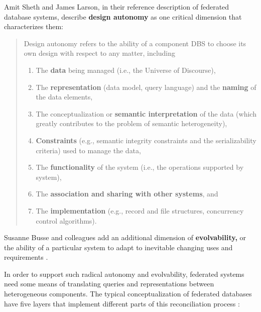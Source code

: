 \documentclass[10pt]{article}
\begin{document}
\begin{multicols}{2}
Amit Sheth and James Larson, in their reference description of federated
database systems, describe \textbf{design autonomy} as one critical
dimension that characterizes them:

\begin{quote}
Design autonomy refers to the ability of a component DBS to choose its
own design with respect to any matter, including

\begin{enumerate}
\def\labelenumi{(\alph{enumi})}
\item
  The \textbf{data} being managed (i.e., the Universe of Discourse),
\item
  The \textbf{representation} (data model, query language) and the
  \textbf{naming} of the data elements,
\item
  The conceptualization or \textbf{semantic interpretation} of the data
  (which greatly contributes to the problem of semantic heterogeneity),
\item
  \textbf{Constraints} (e.g., semantic integrity constraints and the
  serializability criteria) used to manage the data,
\item
  The \textbf{functionality} of the system (i.e., the operations
  supported by system),
\item
  The \textbf{association and sharing with other systems}, and
\item
  The \textbf{implementation} (e.g., record and file structures,
  concurrency control algorithms).
\end{enumerate}
\end{quote}

Susanne Busse and colleagues add an additional dimension of
\textbf{evolvability,} or the ability of a particular system to adapt to
inevitable changing uses and requirements \cite{busseFederatedInformationSystems1999} .

In order to support such radical autonomy and evolvability, federated
systems need some means of translating queries and representations
between heterogeneous components. The typical conceptualization of
federated databases have five layers that implement different parts of
this reconciliation process \cite{shethFederatedDatabaseSystems1990} :

\begin{itemize}


\end{itemize}
\end{multicols}
\end{document}
